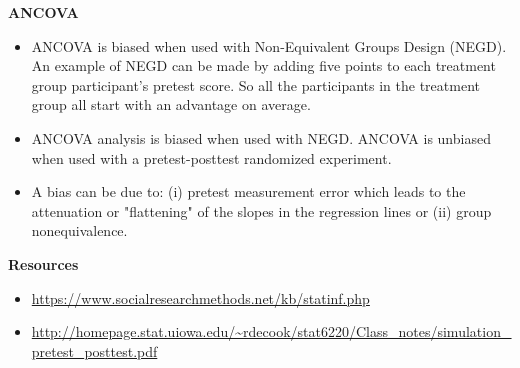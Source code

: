 \documentclass[hidelinks,11pt,a4paper]{report}
\begin{document}
\noindent \textbf{ANCOVA}
\begin{itemize}
\item ANCOVA is biased when used with Non-Equivalent Groups Design (NEGD). An example of NEGD can be made by adding five points to each treatment group participant's pretest score. So all the participants in the treatment group all start with an advantage on average.
\item ANCOVA analysis is biased when used with NEGD. ANCOVA is unbiased when used with a pretest-posttest randomized experiment.
\item A bias can be due to: (i) pretest measurement error which leads to the attenuation or "flattening" of the slopes in the regression lines or (ii) group nonequivalence.
\end{itemize}

\noindent \textbf{Resources}
\begin{itemize}
\item \url{https://www.socialresearchmethods.net/kb/statinf.php}
\item \url{http://homepage.stat.uiowa.edu/~rdecook/stat6220/Class_notes/simulation_pretest_posttest.pdf}
\end{itemize}



\end{document}
